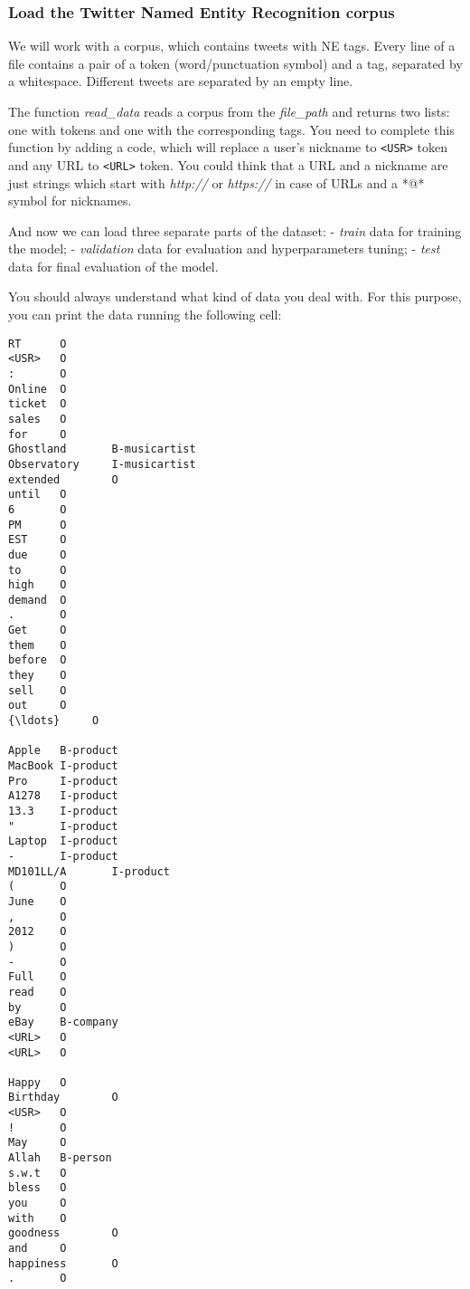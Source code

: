 \documentclass[11pt]{article}
\begin{document}
    \hypertarget{load-the-twitter-named-entity-recognition-corpus}{%
\subsubsection{Load the Twitter Named Entity Recognition
corpus}\label{load-the-twitter-named-entity-recognition-corpus}}

We will work with a corpus, which contains tweets with NE tags. Every
line of a file contains a pair of a token (word/punctuation symbol) and
a tag, separated by a whitespace. Different tweets are separated by an
empty line.

The function \emph{read\_data} reads a corpus from the \emph{file\_path}
and returns two lists: one with tokens and one with the corresponding
tags. You need to complete this function by adding a code, which will
replace a user's nickname to \texttt{\textless{}USR\textgreater{}} token
and any URL to \texttt{\textless{}URL\textgreater{}} token. You could
think that a URL and a nickname are just strings which start with
\emph{http://} or \emph{https://} in case of URLs and a *@* symbol for
nicknames.

    And now we can load three separate parts of the dataset: - \emph{train}
data for training the model; - \emph{validation} data for evaluation and
hyperparameters tuning; - \emph{test} data for final evaluation of the
model.

    You should always understand what kind of data you deal with. For this
purpose, you can print the data running the following cell:

    \begin{Verbatim}[commandchars=\\\{\}]
RT      O
<USR>   O
:       O
Online  O
ticket  O
sales   O
for     O
Ghostland       B-musicartist
Observatory     I-musicartist
extended        O
until   O
6       O
PM      O
EST     O
due     O
to      O
high    O
demand  O
.       O
Get     O
them    O
before  O
they    O
sell    O
out     O
{\ldots}     O

Apple   B-product
MacBook I-product
Pro     I-product
A1278   I-product
13.3    I-product
"       I-product
Laptop  I-product
-       I-product
MD101LL/A       I-product
(       O
June    O
,       O
2012    O
)       O
-       O
Full    O
read    O
by      O
eBay    B-company
<URL>   O
<URL>   O

Happy   O
Birthday        O
<USR>   O
!       O
May     O
Allah   B-person
s.w.t   O
bless   O
you     O
with    O
goodness        O
and     O
happiness       O
.       O

    \end{Verbatim}
\end{document}
